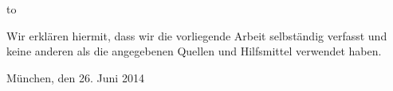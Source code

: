 \thispagestyle{empty}
\vspace*{42\baselineskip}
\hbox to \textwidth{\hrulefill}
\par
Wir erklären hiermit, dass wir die vorliegende Arbeit selbständig verfasst und
keine anderen als die angegebenen Quellen und Hilfsmittel verwendet haben.

München, den 26. Juni 2014

\clearpage






